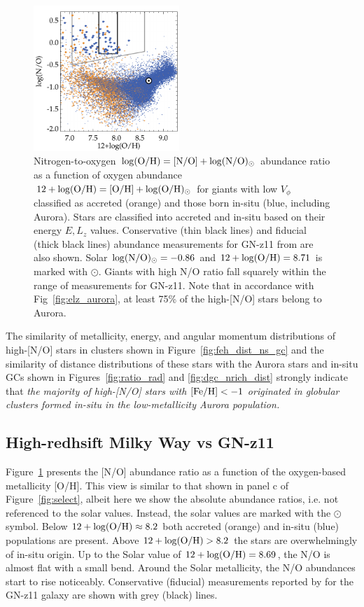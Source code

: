\documentclass[a4paper,useAMS,usenatbib]{mnras}
\begin{document}
%
\begin{figure}
  \centering
  \includegraphics[width=0.49\textwidth]{img/no_oh.pdf}
  \caption[]{Nitrogen-to-oxygen $\log({\rm O/H})=[{\rm N/O}]+\log({\rm N/O})_{\odot}$ abundance ratio as a function of oxygen abundance $12+\log({\rm O/H})=[{\rm O/H}]+\log({\rm O/H})_{\odot}$ for giants with low $V_\phi$ classified as accreted (orange) and those born in-situ (blue, including Aurora). Stars are classified into accreted and in-situ based on their energy $E,L_z$ values. Conservative (thin black lines) and fiducial (thick black lines) abundance measurements for GN-z11 from \citet{Cameron2023} are also shown. Solar $\log({\rm N/O})_{\odot}=-0.86$ and $12+\log({\rm O/H})=8.71$ is marked with $\odot$. Giants with high N/O ratio fall squarely within the range of measurements for GN-z11. Note that in accordance with Fig~\ref{fig:elz_aurora}, at least 75\% of the high-[N/O] stars belong to Aurora.} 
   \label{fig:no_oh}
\end{figure}
%

The similarity of metallicity, energy, and angular momentum distributions of high-[N/O] stars in clusters shown in Figure~\ref{fig:feh_dist_ns_gc} and the similarity of distance distributions of these stars with the Aurora stars and in-situ GCs shown in Figures~\ref{fig:ratio_rad} and \ref{fig:dgc_nrich_dist} strongly indicate that  {\it the majority of high-[N/O] stars with $\rm [Fe/H]<-1$ originated in globular clusters formed in-situ in the low-metallicity Aurora population.}  

\subsection{High-redhsift Milky Way vs GN-z11}
\label{sec:gnz11}

Figure~\ref{fig:no_oh} presents the [N/O] abundance ratio as a function of the oxygen-based metallicity [O/H]. This view is similar to that shown in panel c of Figure~\ref{fig:select}, albeit here we show the absolute abundance ratios, i.e. not referenced to the solar values. Instead, the solar values are marked with the $\odot$ symbol. Below $12+\log({\rm O/H})\approx8.2$ both accreted (orange) and in-situ (blue) populations are present. Above $12+\log({\rm O/H})>8.2$ the stars are overwhelmingly of in-situ origin. Up to the Solar value of $12+\log({\rm O/H)=8.69}$, the N/O is almost flat with a small bend. Around the Solar metallicity, the N/O abundances start to rise noticeably. Conservative (fiducial) measurements reported by \citet{Cameron2023} for the GN-z11 galaxy are shown with grey (black) lines. 
\end{document}
